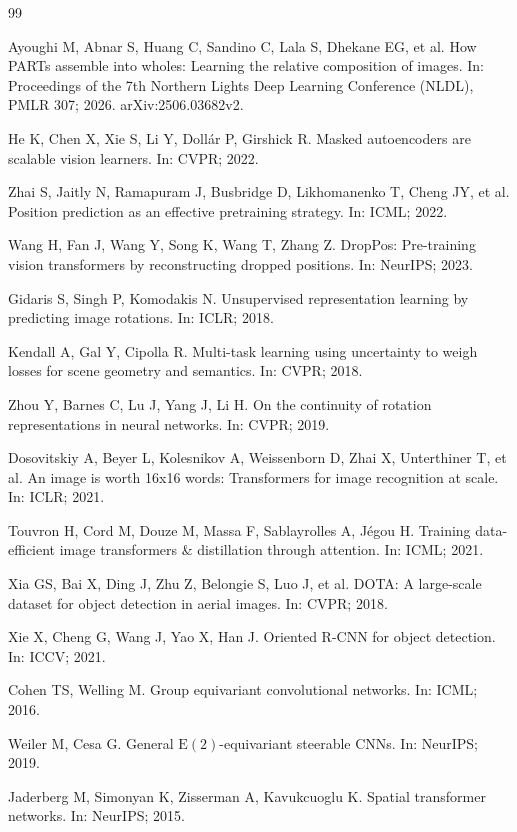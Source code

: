 \documentclass[11pt,a4paper]{article}
\begin{document}
\begin{thebibliography}{99}
\setlength{\itemsep}{0pt}

 Ayoughi M, Abnar S, Huang C, Sandino C, Lala S, Dhekane EG, et al. How PARTs assemble into wholes: Learning the relative composition of images. In: Proceedings of the 7th Northern Lights Deep Learning Conference (NLDL), PMLR 307; 2026. arXiv:2506.03682v2.

 He K, Chen X, Xie S, Li Y, Doll\'ar P, Girshick R. Masked autoencoders are scalable vision learners. In: CVPR; 2022.

 Zhai S, Jaitly N, Ramapuram J, Busbridge D, Likhomanenko T, Cheng JY, et al. Position prediction as an effective pretraining strategy. In: ICML; 2022.

 Wang H, Fan J, Wang Y, Song K, Wang T, Zhang Z. DropPos: Pre-training vision transformers by reconstructing dropped positions. In: NeurIPS; 2023.

 Gidaris S, Singh P, Komodakis N. Unsupervised representation learning by predicting image rotations. In: ICLR; 2018.

 Kendall A, Gal Y, Cipolla R. Multi-task learning using uncertainty to weigh losses for scene geometry and semantics. In: CVPR; 2018.

 Zhou Y, Barnes C, Lu J, Yang J, Li H. On the continuity of rotation representations in neural networks. In: CVPR; 2019.

 Dosovitskiy A, Beyer L, Kolesnikov A, Weissenborn D, Zhai X, Unterthiner T, et al. An image is worth 16x16 words: Transformers for image recognition at scale. In: ICLR; 2021.

 Touvron H, Cord M, Douze M, Massa F, Sablayrolles A, J\'egou H. Training data-efficient image transformers \& distillation through attention. In: ICML; 2021.

 Xia GS, Bai X, Ding J, Zhu Z, Belongie S, Luo J, et al. DOTA: A large-scale dataset for object detection in aerial images. In: CVPR; 2018.

 Xie X, Cheng G, Wang J, Yao X, Han J. Oriented R-CNN for object detection. In: ICCV; 2021.

 Cohen TS, Welling M. Group equivariant convolutional networks. In: ICML; 2016.

 Weiler M, Cesa G. General $\mathrm{E}(2)$-equivariant steerable CNNs. In: NeurIPS; 2019.

 Jaderberg M, Simonyan K, Zisserman A, Kavukcuoglu K. Spatial transformer networks. In: NeurIPS; 2015.

\end{thebibliography}
\end{document}

